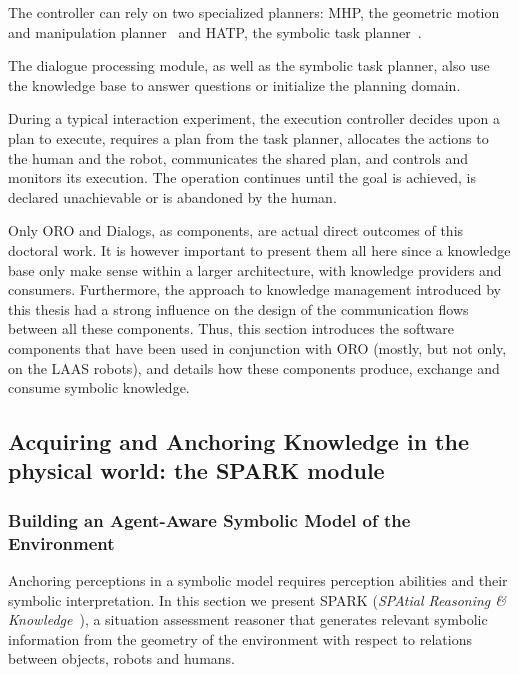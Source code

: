 The controller can rely on two specialized planners: MHP, the geometric motion
and manipulation planner~\cite{Sisbot2008, Mainprice2011, Pandey2010} and HATP,
the symbolic task planner~\cite{Alili2008}.

The dialogue processing module, as well as the symbolic task planner, also use
the knowledge base to answer questions or initialize the planning domain.

During a typical interaction experiment, the execution controller decides upon
a plan to execute, requires a plan from the task planner, allocates the actions
to the human and the robot, communicates the shared plan, and controls and
monitors its execution. The operation continues until the goal is achieved, is
declared unachievable or is abandoned by the human.

Only ORO and Dialogs, as components, are actual direct outcomes of this
doctoral work. It is however important to present them all here since a
knowledge base only make sense within a larger architecture, with knowledge
providers and consumers.  Furthermore, the approach to knowledge management
introduced by this thesis had a strong influence on the design of the
communication flows between all these components. Thus, this section introduces
the software components that have been used in conjunction with ORO (mostly,
but not only, on the LAAS robots), and details how these components produce,
exchange and consume symbolic knowledge.

\subsection{Acquiring and Anchoring Knowledge in the physical world: the SPARK module}
\label{sect|spark}

\subsubsection{Building an Agent-Aware Symbolic Model of the Environment}
\label{sect|situ}

Anchoring perceptions in a symbolic model requires perception abilities and
their symbolic interpretation. In this section we present SPARK (\emph{SPAtial
Reasoning \& Knowledge}~\cite{Sisbot2011}), a situation assessment reasoner
that generates relevant symbolic information from the geometry of the
environment with respect to relations between objects, robots and humans.

